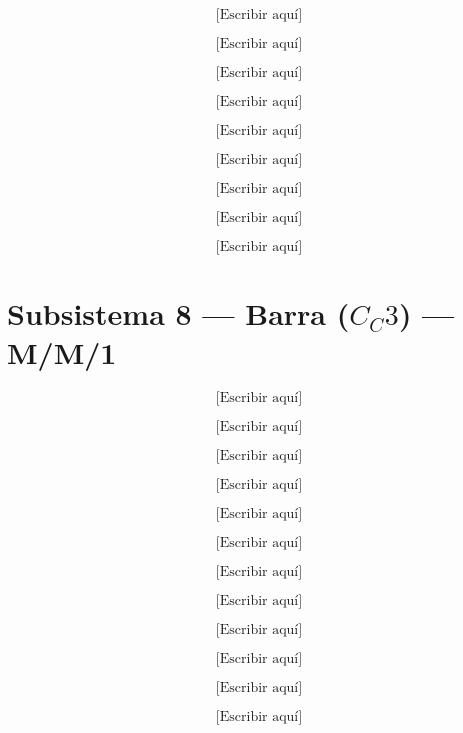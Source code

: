\documentclass[12pt,a4paper]{article}
\begin{document}
\[
\text{[Escribir aquí]} \tag{7.4}
\]

\[
\text{[Escribir aquí]} \tag{7.5}
\]

\[
\text{[Escribir aquí]} \tag{7.6}
\]

\[
\text{[Escribir aquí]} \tag{7.7}
\]

\[
\text{[Escribir aquí]} \tag{7.8}
\]

\[
\text{[Escribir aquí]} \tag{7.9}
\]

\[
\text{[Escribir aquí]} \tag{7.10}
\]

\[
\text{[Escribir aquí]} \tag{7.11}
\]

\[
\text{[Escribir aquí]} \tag{7.12}
\]

\vspace{1cm}
\section*{Subsistema 8 — Barra ($C_C 3$) — M/M/1}

\[
\text{[Escribir aquí]} \tag{8.1}
\]

\[
\text{[Escribir aquí]} \tag{8.2}
\]

\[
\text{[Escribir aquí]} \tag{8.3}
\]

\[
\text{[Escribir aquí]} \tag{8.4}
\]

\[
\text{[Escribir aquí]} \tag{8.5}
\]

\[
\text{[Escribir aquí]} \tag{8.6}
\]

\[
\text{[Escribir aquí]} \tag{8.7}
\]

\[
\text{[Escribir aquí]} \tag{8.8}
\]

\[
\text{[Escribir aquí]} \tag{8.9}
\]

\[
\text{[Escribir aquí]} \tag{8.10}
\]

\[
\text{[Escribir aquí]} \tag{8.11}
\]

\[
\text{[Escribir aquí]} \tag{8.12}
\]
\end{document}
